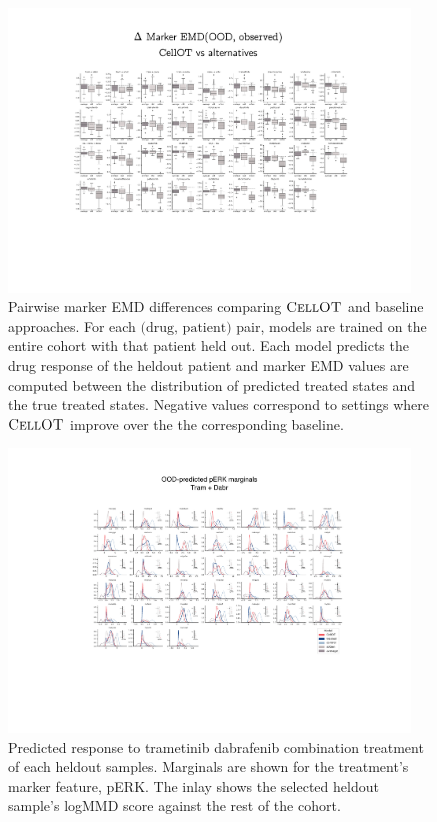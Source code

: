 \begin{figure}
  \begin{center}
    \includegraphics[width=0.95\textwidth]{figures/cellot-cohort/ood-eval-marker.pdf}
  \end{center}
  \caption{
    Pairwise marker EMD differences comparing $\textsc{CellOT}$ and baseline approaches.
    For each $\text{(drug, patient)}$ pair, models are trained on the entire cohort with that patient held out.
    Each model predicts the drug response of the heldout patient
    and marker EMD values are computed between the distribution of predicted treated states and the true treated states.
    Negative values correspond to settings where $\textsc{CellOT}$ improve over the the corresponding baseline.
  }
  \label{fig:ood-eval-marker}
\end{figure}

\begin{figure}
  \begin{center}
    \includegraphics[width=0.95\textwidth]{figures/cellot-cohort/ood-predict-marginals.pdf}
  \end{center}
  \caption{
    Predicted response to trametinib dabrafenib combination treatment of each heldout samples.
    Marginals are shown for the treatment's marker feature, pERK.
    The inlay shows the selected heldout sample's logMMD score against the rest of the cohort.
  }\label{fig:ood-predict-marginals}
\end{figure}

